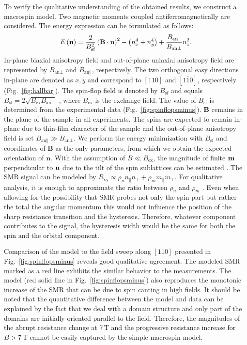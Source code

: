 \documentclass[%
 aps,
prl,
superscriptaddress,
 amsmath,amssymb,
reprint,%
]{revtex4-2}
\begin{document}
To verify the qualitative understanding of the obtained results, we construct a macrospin model. Two magnetic moments coupled antiferromagnetically are considered. The energy expression \cite{Gomonay2010PRB} can be formulated as follows:
\begin{equation}
E \left(\bf{n}\right)=\frac{2}{B_{\text{sf}}^2}\left(\bf{B}\cdot\bf{n}\right)^2-\left(n_x^4+n_y^4\right)+\frac{B_{\text{an}\parallel}}{B_{\text{an}\perp}}n_z^2 . \label{eqn:1}
\end{equation}
 In-plane biaxial anisotropy field and out-of-plane uniaxial anisotropy field are represented by $B_{\text{an}\perp}$ and $B_{\text{an}\parallel}$, respectively. The two orthogonal easy directions in-plane are denoted as $x,y$ and correspond to $[110]$ and $[1\overline{1}0]$, respectively (Fig.~\ref{fig:hallbar}). The spin-flop field is denoted by $B_\text{sf}$ and equals $B_\text{sf}=2\sqrt{B_\text{ex}B_{\text{an}\perp}}$ \cite{Gomonay2010PRB}, where $B_{\text{ex}}$ is the exchange field. The value of $B_\text{sf}$ is determined from the experimental data (Fig.~\ref{fig:spinflopsminus}).  $\bf{B}$ remains in the plane of the sample in all experiments. The spins are expected to remain in-plane due to thin-film character of the sample \cite{Baldrati2020PRL, CaO2011APL} and the out-of-plane anisotropy field is set $B_{\text{an}\parallel} \gg B_{\text{an}\perp}$. We perform the energy minimization with $B_{\text{sf}}$ and coordinates of $\mathbf{B}$ as the only parameters, from which we obtain the expected orientation of $\mathbf{n}$. With the assumption of $B \ll B_\text{ex}$, the magnitude of finite $\bf{m}$ perpendicular to $\bf{n}$ due to the tilt of the spin sublattices can be estimated \cite{Gomonay2010PRB, supplement}. The SMR signal can be modeled by $R_{\text{xy}} \propto \rho_n n_\parallel n_\perp+\rho_m m_\parallel m_\perp$. For qualitative analysis, it is enough to approximate the ratio between $\rho_n$ and $\rho_m$ \cite{supplement}. Even when allowing for the possibility that SMR probes not only the spin part but rather the total the angular momentum this would not influence the position of the sharp resistance transition and the hysteresis. Therefore, whatever component contributes to the signal, the hysteresis width would be the same for both the spin and the orbital component.

Comparison of the model to the field sweep along $[110]$ presented in Fig.~\ref{fig:spinflopsminus} reveals good qualitative agreement. The modeled SMR marked as a red line exhibits the similar behavior to the measurements. The model (red solid line in Fig.~\ref{fig:spinflopsminus}) also reproduces the monotonic increase of the SMR that can be due to spin canting in high fields. It should be noted that the quantitative difference between the model and data can be explained by the fact that we deal with a domain structure and only part of the domains are initially oriented parallel to the field. Therefore, the magnitudes of the abrupt resistance change at $7\,\text{T}$ and the progressive resistance increase for $B>7\,\text{T}$ cannot be easily captured by the simple macrospin model.
\end{document}
